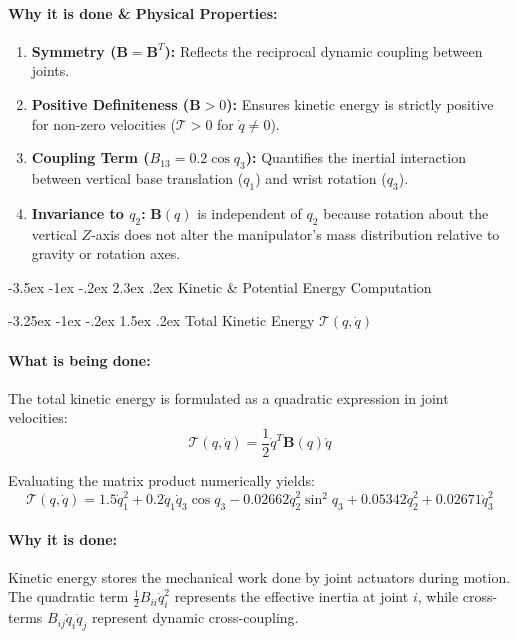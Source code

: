\documentclass[11pt, a4paper]{article}
\makeatletter
\renewcommand{\section}{\@startsection{section}{1}{\z@}%
    {-3.5ex \@plus -1ex \@minus -.2ex}%
    {2.3ex \@plus .2ex}%
    {\normalfont\Large\bfseries\color{brandblue}}}
\renewcommand{\subsection}{\@startsection{subsection}{2}{\z@}%
    {-3.25ex \@plus -1ex \@minus -.2ex}%
    {1.5ex \@plus .2ex}%
    {\normalfont\large\bfseries\color{brandaccent}}}
\makeatother
\begin{document}
\paragraph{Why it is done \& Physical Properties:}
\begin{enumerate}[leftmargin=1.5em]
    \item \textbf{Symmetry ($\mathbf{B} = \mathbf{B}^T$):} Reflects the reciprocal dynamic coupling between joints.
    \item \textbf{Positive Definiteness ($\mathbf{B} > 0$):} Ensures kinetic energy is strictly positive for non-zero velocities ($\mathcal{T} > 0$ for $\dot{q} \neq 0$).
    \item \textbf{Coupling Term ($B_{13} = 0.2 \cos q_3$):} Quantifies the inertial interaction between vertical base translation ($q_1$) and wrist rotation ($q_3$).
    \item \textbf{Invariance to $q_2$:} $\mathbf{B}(q)$ is independent of $q_2$ because rotation about the vertical $Z$-axis does not alter the manipulator's mass distribution relative to gravity or rotation axes.
\end{enumerate}

\section{Kinetic \& Potential Energy Computation}

\subsection{Total Kinetic Energy \texorpdfstring{$\mathcal{T}(q, \dot{q})$}{T(q, dq)}}
\paragraph{What is being done:}
The total kinetic energy is formulated as a quadratic expression in joint velocities:
\begin{equation}
    \mathcal{T}(q, \dot{q}) = \frac{1}{2} \dot{q}^T \mathbf{B}(q) \dot{q}
\end{equation}

Evaluating the matrix product numerically yields:
\begin{equation}
    \mathcal{T}(q, \dot{q}) = 1.5 \dot{q}_1^2 + 0.2 \dot{q}_1 \dot{q}_3 \cos q_3 - 0.02662 \dot{q}_2^2 \sin^2 q_3 + 0.05342 \dot{q}_2^2 + 0.02671 \dot{q}_3^2
\end{equation}

\paragraph{Why it is done:}
Kinetic energy stores the mechanical work done by joint actuators during motion. The quadratic term $\frac{1}{2} B_{ii} \dot{q}_i^2$ represents the effective inertia at joint $i$, while cross-terms $B_{ij} \dot{q}_i \dot{q}_j$ represent dynamic cross-coupling.
\end{document}
